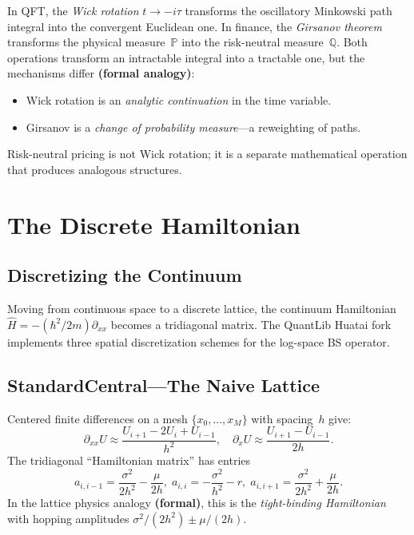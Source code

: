 In QFT, the \emph{Wick rotation} $t \to -i\tau$ transforms the oscillatory Minkowski path integral into the convergent Euclidean one.  In finance, the \emph{Girsanov theorem} transforms the physical measure~$\mathbb{P}$ into the risk-neutral measure~$\mathbb{Q}$.  Both operations transform an intractable integral into a tractable one, but the mechanisms differ \textbf{(formal analogy)}:
\begin{itemize}
  \item Wick rotation is an \emph{analytic continuation} in the time variable.
  \item Girsanov is a \emph{change of probability measure}---a reweighting of paths.
\end{itemize}
Risk-neutral pricing is not Wick rotation; it is a separate mathematical operation that produces analogous structures.

\section{The Discrete Hamiltonian}
\label{sec:discrete-hamiltonian}

\subsection{Discretizing the Continuum}

Moving from continuous space to a discrete lattice, the continuum Hamiltonian $\hat{H} = -(\hbar^2/2m)\partial_{xx}$ becomes a tridiagonal matrix.  The QuantLib Huatai fork implements three spatial discretization schemes for the log-space BS operator.

\subsection{StandardCentral---The Naive Lattice}

Centered finite differences on a mesh $\{x_0, \ldots, x_M\}$ with spacing~$h$ give:
\begin{equation}\label{eq:centered-fd}
  \partial_{xx}U \approx \frac{U_{i+1} - 2U_i + U_{i-1}}{h^2},
  \quad
  \partial_x U \approx \frac{U_{i+1} - U_{i-1}}{2h}.
\end{equation}
The tridiagonal ``Hamiltonian matrix'' has entries
\begin{equation}\label{eq:standard-central}
  a_{i,i-1} = \frac{\sigma^2}{2h^2} - \frac{\mu}{2h},\;
  a_{i,i}   = -\frac{\sigma^2}{h^2} - r,\;
  a_{i,i+1} = \frac{\sigma^2}{2h^2} + \frac{\mu}{2h}.
\end{equation}
In the lattice physics analogy \textbf{(formal)}, this is the \emph{tight-binding Hamiltonian} with hopping amplitudes $\sigma^2/(2h^2) \pm \mu/(2h)$.


